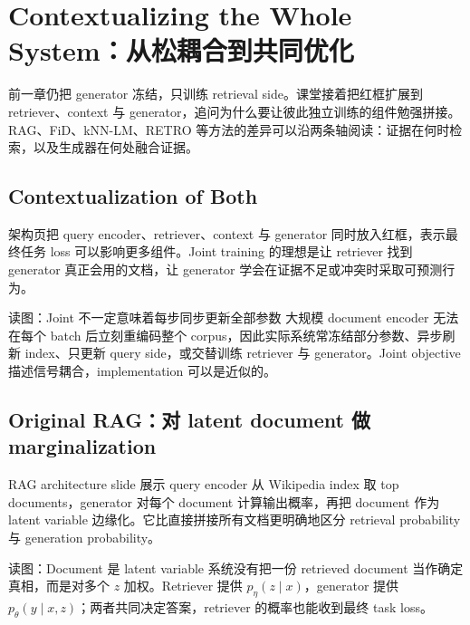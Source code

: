 \section{Contextualizing the Whole System：从松耦合到共同优化}

前一章仍把 generator 冻结，只训练 retrieval side。课堂接着把红框扩展到 retriever、context 与 generator，追问为什么要让彼此独立训练的组件勉强拼接。RAG、FiD、kNN-LM、RETRO 等方法的差异可以沿两条轴阅读：证据在何时检索，以及生成器在何处融合证据。

\subsection{Contextualization of Both}

架构页把 query encoder、retriever、context 与 generator 同时放入红框，表示最终任务 loss 可以影响更多组件。Joint training 的理想是让 retriever 找到 generator 真正会用的文档，让 generator 学会在证据不足或冲突时采取可预测行为。


\begin{knowledgebox}{读图：Joint 不一定意味着每步同步更新全部参数}
大规模 document encoder 无法在每个 batch 后立刻重编码整个 corpus，因此实际系统常冻结部分参数、异步刷新 index、只更新 query side，或交替训练 retriever 与 generator。Joint objective 描述信号耦合，implementation 可以是近似的。
\end{knowledgebox}


\subsection{Original RAG：对 latent document 做 marginalization}

RAG architecture slide 展示 query encoder 从 Wikipedia index 取 top documents，generator 对每个 document 计算输出概率，再把 document 作为 latent variable 边缘化。它比直接拼接所有文档更明确地区分 retrieval probability 与 generation probability。


\begin{knowledgebox}{读图：Document 是 latent variable}
系统没有把一份 retrieved document 当作确定真相，而是对多个 $z$ 加权。Retriever 提供 $p_\eta(z\mid x)$，generator 提供 $p_\theta(y\mid x,z)$；两者共同决定答案，retriever 的概率也能收到最终 task loss。
\end{knowledgebox}

